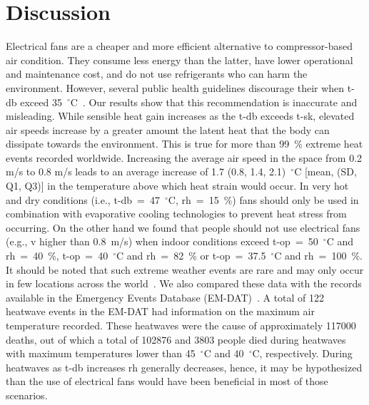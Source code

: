 
\section{Discussion}\label{sec:discussion}

Electrical fans are a cheaper and more efficient alternative to compressor-based air condition.
They consume less energy than the latter, have lower operational and maintenance cost, and do not use refrigerants who can harm the environment.
However, several public health guidelines discourage their when \acf{t-db} exceed 35~$^{\circ}$C~\cite{WMO2015}.
Our results show that this recommendation is inaccurate and misleading.
While sensible heat gain increases as the \ac{t-db} exceeds \acf{t-sk}, elevated air speeds increase by a greater amount the latent heat that the body can dissipate towards the environment.
This is true for more than 99~\% extreme heat events recorded worldwide.
Increasing the average air speed in the space from 0.2 m/s to 0.8 m/s leads to an average increase of 1.7 (0.8, 1.4, 2.1)~$^{\circ}$C [mean, (SD, Q1, Q3)] in the temperature above which heat strain would occur.
In very hot and dry conditions (i.e., \ac{t-db}~=~47~$^{\circ}$C, \ac{rh}~=~15~\%) fans should only be used in combination with evaporative cooling technologies to prevent heat stress from occurring.
On the other hand we found that people should not use electrical fans (e.g., \ac{v} higher than 0.8~m/s) when indoor conditions exceed \ac{t-op}~=~50~$^{\circ}$C and \ac{rh}~=~40~\%, \ac{t-op}~=~40~$^{\circ}$C and \ac{rh}~=~82~\% or \ac{t-op}~=~37.5~$^{\circ}$C and \ac{rh}~=~100~\%.
It should be noted that such extreme weather events are rare and may only occur in few locations across the world~\cite{ASHRA2017}.
We also compared these data with the records available in the Emergency Events Database (EM-DAT)~\cite{EMDATThe70:online}.
A total of 122 heatwave events in the EM-DAT had information on the maximum air temperature recorded.
These heatwaves were the cause of approximately 117000 deaths, out of which a total of 102876 and 3803 people died during heatwaves with maximum temperatures lower than 45~$^{\circ}$C and 40~$^{\circ}$C, respectively.
During heatwaves as \ac{t-db} increases \ac{rh} generally decreases, hence, it may be hypothesized than the use of electrical fans would have been beneficial in most of those scenarios.

